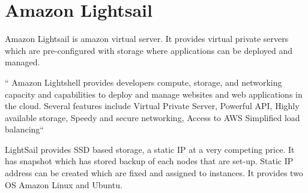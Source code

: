 \section{Amazon Lightsail}

Amazon Lightsail is amazon virtual server. It provides virtual private servers
which are pre-configured with storage where  applications can be deployed
and managed. 

`` Amazon Lightshell provides developers compute, storage, and networking 
capacity and capabilities to deploy and manage websites and web applications
in the cloud. 
Several features include Virtual Private Server, Powerful API, Highly available 
storage, Speedy and secure networking, Access to AWS Simplified load 
balancing``\cite{hid-sp18-522-lightsail}

LightSail provides SSD based storage, a static IP at a very competing price. 
It has snapshot which has stored backup of each nodes that are set-up. 
Static IP address can be created which are fixed and assigned to instances. 
It provides two OS Amazon Linux and Ubuntu.

